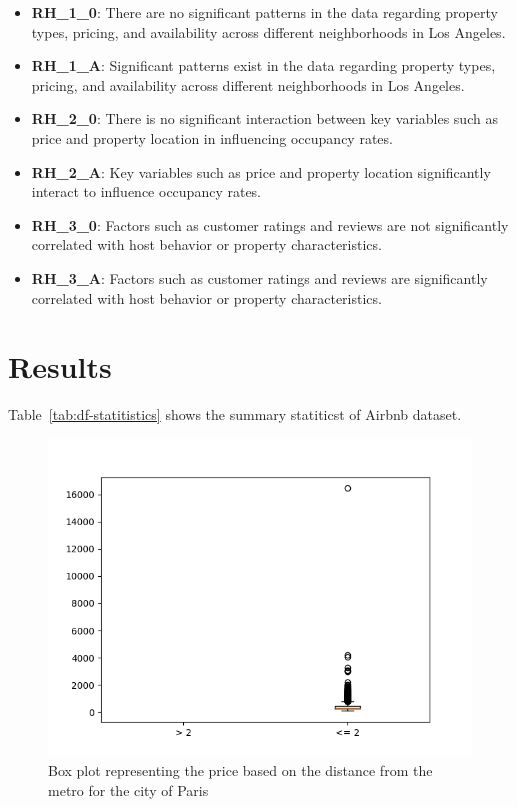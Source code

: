 \documentclass[10pt, conference, compsocconf]{IEEEtran}
\begin{document}
\begin{itemize}
  \item \textbf{RH\_1\_0}: There are no significant patterns in the data regarding property types, pricing, and availability across different neighborhoods in Los Angeles.  
  \item \textbf{RH\_1\_A}: Significant patterns exist in the data regarding property types, pricing, and availability across different neighborhoods in Los Angeles.  

  \item \textbf{RH\_2\_0}: There is no significant interaction between key variables such as price and property location in influencing occupancy rates.  
  \item \textbf{RH\_2\_A}: Key variables such as price and property location significantly interact to influence occupancy rates.  

  \item \textbf{RH\_3\_0}: Factors such as customer ratings and reviews are not significantly correlated with host behavior or property characteristics.  
  \item \textbf{RH\_3\_A}: Factors such as customer ratings and reviews are significantly correlated with host behavior or property characteristics.  
\end{itemize}

\lipsum[2-3]

\section{Results}
\lipsum[2-3]
Table~\ref{tab:df-statitistics} shows the summary statiticst of Airbnb dataset. 
\begin{figure}[ht]
  \centering
  \includegraphics[width=\columnwidth]{figures/price-vs-distance-paris.png}
  \caption{Box plot representing the price based on the distance from the metro for the city of Paris}
  \label{fig:box-plot-paris}
\end{figure}
\lipsum[1]
\end{document}
